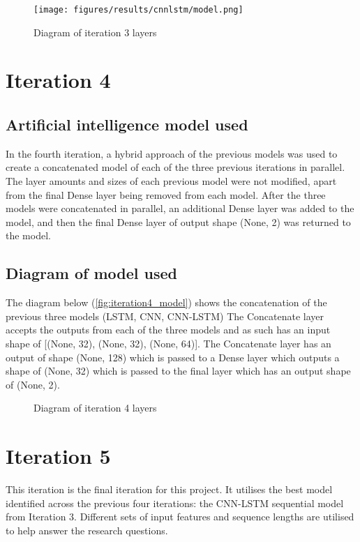 \begin{figure}[ht]
    \centering
    \texttt{[image: figures/results/cnnlstm/model.png]}
    \caption[Diagram of iteration 3 layers]{Diagram of iteration 3 layers}
    \label{fig:iteration3_model}
\end{figure}
\FloatBarrier

\section{Iteration 4}
\subsection{Artificial intelligence model used}\label{ssec:iteration4_ai_model}
In the fourth iteration, a hybrid approach of the previous models was used to create a concatenated model of each
of the three previous iterations in parallel. The layer amounts and sizes of each previous model were not modified, apart from
the final Dense layer being removed from each model. After the three models were concatenated in parallel,
an additional Dense layer was added to the model, and then the final Dense layer of output shape (None, 2) was returned to the model.

\subsection{Diagram of model used}
The diagram below (\autoref{fig:iteration4_model}) shows the concatenation of the previous three models (LSTM, CNN, CNN-LSTM)
The Concatenate layer accepts the outputs from each of the three models and as such has an input shape of
{[(None, 32), (None, 32), (None, 64)]}. The Concatenate layer has an output of shape (None, 128) which is passed to a Dense
layer which outputs a shape of (None, 32) which is passed to the final layer which has an output shape of (None, 2).
\begin{figure}[p]
    \centering
    \caption[Diagram of iteration 4 layers]{Diagram of iteration 4 layers}
    \label{fig:iteration4_model}
\end{figure}
\FloatBarrier

\section{Iteration 5}
This iteration is the final iteration for this project. It utilises the best model identified across the
previous four iterations: the CNN-LSTM sequential model from Iteration 3. Different sets of input features
and sequence lengths are utilised to help answer the research questions.

